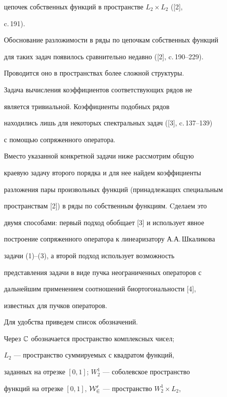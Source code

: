 цепочек собственных функций в пространстве $L_2\times L_2$ ([2], 


c.\,191). 


Обоснование разложимости в ряды по цепочкам собственных функций  


для таких задач появилось сравнительно недавно ([2], c.\,190--229). 


Проводится оно в пространствах более сложной структуры.  


Задача вычисления коэффициентов соответствующих рядов не  


является тривиальной. Коэффициенты подобных рядов  


находились лишь для некоторых спектральных задач ([3], c.\,137--139) 


с помощью сопряженного оператора. 


 


Вместо указанной конкретной задачи ниже рассмотрим общую  


краевую задачу второго порядка и для нее найдем коэффициенты  


разложения пары произвольных функций (принадлежащих специальным  


пространствам [2]) в ряды по собственным функциям. Cделаем это  


двумя способами: первый подход обобщает [3] и использует явное  


построение сопряженного оператора к линеаризатору А.А.\,Шкаликова  


задачи (1)--(3), а второй подход использует возможность  


представления задачи в виде пучка неограниченных операторов с 


дальнейшим применением соотношений биортогональности [4],


известных для пучков операторов.  


 


Для удобства приведем список обозначений. 


Через $\Bbb C$ обозначается пространство комплексных чисел; 


$L_2$ --- пространство суммируемых с квадратом функций,  


заданных на отрезке $[0,1]$; $W^1_2$ --- соболевское пространство  


функций на отрезке $[0,1]$, $\cal W^0_2$ --- пространство $W^1_2\times 


L_2$, 


